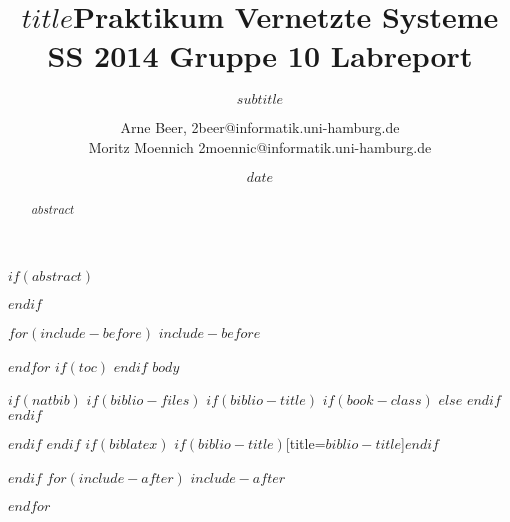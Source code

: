 \documentclass[$if(fontsize)$$fontsize$,$endif$$if(lang)$$lang$,$endif$$if(papersize)$$papersize$,$endif$$for(classoption)$$classoption$$sep$,$endfor$]{$documentclass$}
\title{$title$}
\subtitle{$subtitle$}
\date{$date$}
\title{Praktikum Vernetzte Systeme SS 2014 Gruppe 10 Labreport}
\author{Arne Beer, 2beer@informatik.uni-hamburg.de\\
Moritz Moennich 2moennic@informatik.uni-hamburg.de}
\begin{document}
\maketitle
$if(abstract)$
\begin{abstract}
$abstract$
\end{abstract}
$endif$

$for(include-before)$
$include-before$

$endfor$
$if(toc)$
{
\hypersetup{linkcolor=black}
\setcounter{tocdepth}{$toc-depth$}
\tableofcontents
}
$endif$
$body$

$if(natbib)$
$if(biblio-files)$
$if(biblio-title)$
$if(book-class)$
\renewcommand\bibname{$biblio-title$}
$else$
\renewcommand\refname{$biblio-title$}
$endif$
$endif$


$endif$
$endif$
$if(biblatex)$
\printbibliography$if(biblio-title)$[title=$biblio-title$]$endif$

$endif$
$for(include-after)$
$include-after$

$endfor$
\end{document}
